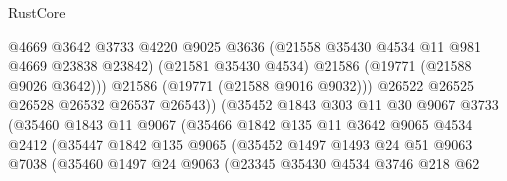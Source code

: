 \begin{lexlean}{RustCore}
\begin{coremodule}
                                      @4669
                                      @3642
                                      @3733
                                      @4220
                                      @9025
                                      @3636
                                      (@21558 @35430 @4534 @11 @981 @4669 @23838 @23842)
                                      (@21581 @35430 @4534)
                                      @21586
                                      (@19771 (@21588 @9026 @3642)))
                                    @21586
                                    (@19771 (@21588 @9016 @9032)))
                                  @26522
                                  @26525
                                  @26528
                                  @26532
                                  @26537
                                  @26543))
                              (@35452
                                @1843
                                @303
                                @11
                                @30
                                @9067
                                @3733
                                (@35460
                                  @1843
                                  @11
                                  @9067
                                  (@35466
                                    @1842
                                    @135
                                    @11
                                    @3642
                                    @9065
                                    @4534
                                    @2412
                                    (@35447
                                      @1842
                                      @135
                                      @9065
                                      (@35452
                                        @1497
                                        @1493
                                        @24
                                        @51
                                        @9063
                                        @7038
                                        (@35460
                                          @1497
                                          @24
                                          @9063
                                          (@23345
                                            @35430
                                            @4534
                                            @3746
                                            @218
                                            @62

\end{coremodule}
\end{lexlean}
